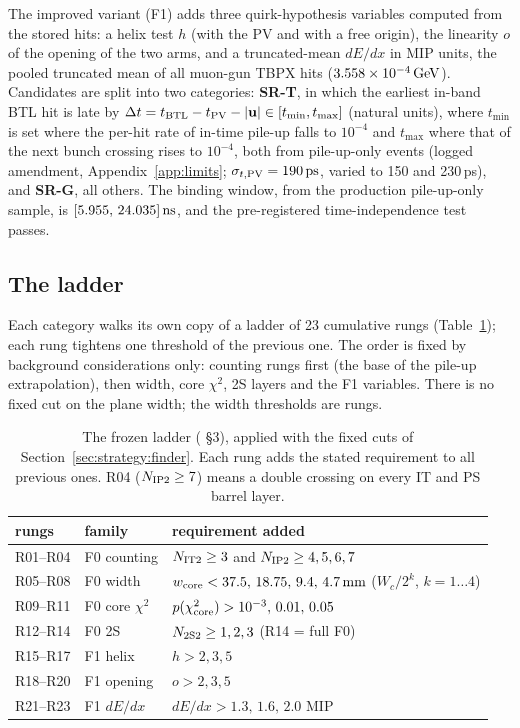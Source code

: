 The improved variant (F1) adds three quirk-hypothesis variables computed from the stored hits: a helix test $h$ (with the
PV and with a free origin), the linearity $o$ of the opening of the two arms, and a truncated-mean $dE/dx$ in MIP units, the pooled truncated mean of all
muon-gun TBPX hits ($3.558\times10^{-4}\,\mathrm{GeV}$). Candidates are split into two categories: \textbf{SR-T},
in which the earliest in-band BTL hit is late by $\Delta t=t_{\rm BTL}-t_{\rm PV}-|\mathbf u|\in[t_{\min},t_{\max}]$
(natural units), where $t_{\min}$ is set where the per-hit rate of in-time pile-up falls to $10^{-4}$ and
$t_{\max}$ where that of the next bunch crossing rises to $10^{-4}$, both from pile-up-only events (logged amendment, Appendix~\ref{app:limits}; $\sigma_{t,\rm PV}=190\,\mathrm{ps}$, varied to 150 and 230\,ps), and \textbf{SR-G}, all others.
The binding window, from the production pile-up-only sample, is $[5.955,\,24.035]\,\mathrm{ns}$, and the
pre-registered time-independence test passes.

\subsection{The ladder}\label{sec:strategy:ladder}
Each category walks its own copy of a ladder of 23 cumulative rungs (Table~\ref{tab:ladder}); each rung tightens one
threshold of the previous one. The order is fixed by background considerations only: counting rungs first (the base of
the pile-up extrapolation), then width, core $\chi^2$, 2S layers and the F1 variables. There is no fixed cut on the plane
width; the width thresholds are rungs.

\begin{table}[htbp]
\centering
\small
\caption{The frozen ladder ( \S3), applied with the fixed cuts of Section~\ref{sec:strategy:finder}.
Each rung adds the stated requirement to all previous ones. R04 ($N_{\rm IP2}\ge7$) means a double crossing on every
IT and PS barrel layer.}
\label{tab:ladder}
\begin{tabular}{lll}
\toprule
rungs & family & requirement added\\
\midrule
R01--R04 & F0 counting & $N_{\rm IT2}\ge3$ and $N_{\rm IP2}\ge4,5,6,7$\\
R05--R08 & F0 width & $w_{\rm core}<37.5,\,18.75,\,9.4,\,4.7\,\mathrm{mm}$ ($W_c/2^k$, $k=1\ldots4$)\\
R09--R11 & F0 core $\chi^2$ & $p(\chi^2_{\rm core})>10^{-3},\,0.01,\,0.05$\\
R12--R14 & F0 2S & $N_{\rm 2S2}\ge1,2,3$ (R14 = full F0)\\
R15--R17 & F1 helix & $h>2,3,5$\\
R18--R20 & F1 opening & $o>2,3,5$\\
R21--R23 & F1 $dE/dx$ & $dE/dx>1.3,\,1.6,\,2.0$ MIP\\
\bottomrule
\end{tabular}
\end{table}

